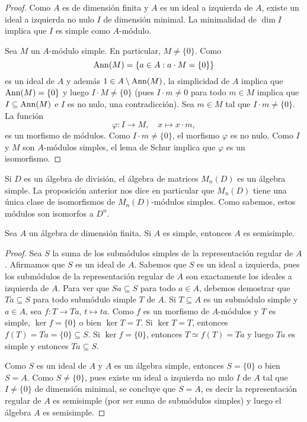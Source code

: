 \begin{proof}
	Como $A$ es de dimensión finita y $A$ es un ideal a izquierda de $A$, existe un ideal a izquierda no nulo $I$ de dimensión minimal. 
	La minimalidad de $\dim I$ implica que $I$ es simple como $A$-módulo. 
	
	Sea $M$ un $A$-módulo simple. En particular, $M\ne\{0\}$. 
	Como 
	\[
	\operatorname{Ann}(M)=\{a\in A:a\cdot M=\{0\}\}
	\]
	es un ideal de $A$ y además $1\in A\setminus\operatorname{Ann}(M)$, la simplicidad de $A$ implica que
	$\operatorname{Ann}(M)=\{0\}$ y luego $I\cdot M\ne \{0\}$ (pues $I\cdot m\ne 0$ para todo $m\in M$ implica que 
	$I\subseteq\operatorname{Ann}(M)$ e $I$ es no nulo, una contradicción).  
	Sea $m\in M$ tal que $I\cdot m\ne\{0\}$. La función
	\[
	\varphi\colon I\to M,\quad
	x\mapsto x\cdot m,
	\]
	es un morfismo de módulos. Como $I\cdot m\ne\{0\}$, el morfismo $\varphi$ es no nulo. 
	Como $I$ y $M$ son $A$-módulos simples, el lema de Schur implica que $\varphi$ es un isomorfismo. 
\end{proof}

Si $D$ es un álgebra de división, 
el álgebra de matrices $M_n(D)$ es un álgebra simple. La proposición anterior nos dice
en particular que $M_n(D)$ tiene una única clase de isomorfismos de $M_n(D)$-módulos simples. Como sabemos, 
estos módulos son isomorfos a $D^n$. 

\begin{proposition}
Sea $A$ un álgebra de dimensión finita. Si $A$ es simple, entonces $A$ es semisimple.	
\end{proposition}

\begin{proof}
	Sea $S$ la suma de los submódulos simples de la representación regular de $A$. 
	Afirmamos que $S$ es un ideal de $A$. Sabemos
	que $S$ es un ideal a izquierda, pues los submódulos de la representación regular de $A$ son exactamente los ideales a izquierda de $A$. 
	Para ver que $Sa\subseteq S$ para todo $a\in A$, debemos
	demostrar que $Ta\subseteq S$ para todo submódulo simple $T$ de $A$. Si $T\subseteq A$ es un submódulo simple y $a\in A$, 
	sea $f\colon T\to Ta$, $t\mapsto ta$. Como $f$ es un morfismo de $A$-módulos y $T$ es simple, $\ker f=\{0\}$ o bien $\ker T=T$. Si $\ker T=T$, entonces
	$f(T)=Ta=\{0\}\subseteq S$. Si $\ker f=\{0\}$, entonces $T\simeq f(T)=Ta$ y luego $Ta$ es simple y entonces $Ta\subseteq S$. 
	
	Como $S$ es un ideal de $A$ y $A$
	es un álgebra simple, entonces $S=\{0\}$ o bien $S=A$.  Como $S\ne\{0\}$, pues 
	existe un ideal a izquierda no nulo $I$ de $A$ tal que $I\ne\{0\}$ de dimensión minimal,  
	se concluye que $S=A$, es decir la representación regular de $A$ 
	es semisimple (por ser suma de submódulos simples) y luego el álgebra 
	$A$ es semisimple. 
\end{proof}

